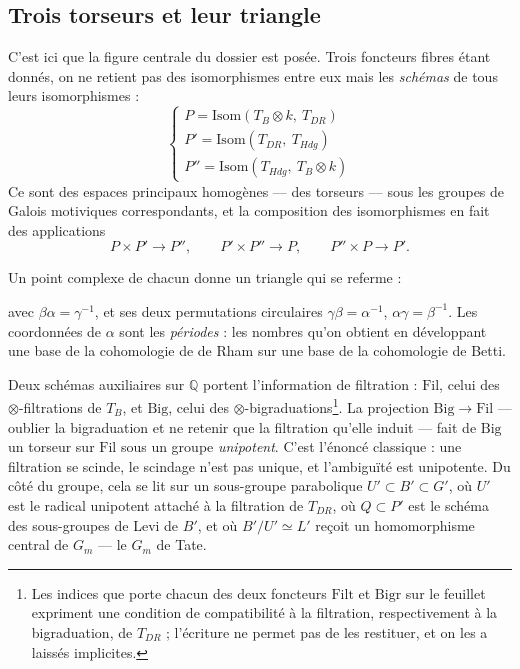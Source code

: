 \documentclass[11pt,a4paper]{article}
\begin{document}
\subsection*{Trois torseurs et leur triangle}

C'est ici que la figure centrale du dossier est posée. Trois foncteurs fibres
étant donnés, on ne retient pas des isomorphismes entre eux mais les
\emph{schémas} de tous leurs isomorphismes :
\[
  \begin{cases}
    P = \mathrm{Isom}(T_{B} \otimes k,\ T_{DR}) \\
    P' = \mathrm{Isom}(T_{DR},\ T_{Hdg}) \\
    P'' = \mathrm{Isom}(T_{Hdg},\ T_{B} \otimes k)
  \end{cases}
\]
Ce sont des espaces principaux homogènes — des torseurs — sous les groupes de
Galois motiviques correspondants, et la composition des isomorphismes en fait
des applications
\[
  P \times P' \to P'' , \qquad P' \times P'' \to P , \qquad P'' \times P \to P' .
\]

Un point complexe de chacun donne un triangle qui se referme :


avec $\beta\alpha = \gamma^{-1}$, et ses deux permutations circulaires
$\gamma\beta = \alpha^{-1}$, $\alpha\gamma = \beta^{-1}$. Les coordonnées de
$\alpha$ sont les \emph{périodes} : les nombres qu'on obtient en développant une
base de la cohomologie de de Rham sur une base de la cohomologie de Betti.

Deux schémas auxiliaires sur $\mathbb{Q}$ portent l'information de filtration :
$\mathrm{Fil}$, celui des $\otimes$-filtrations de $T_{B}$, et $\mathrm{Big}$,
celui des $\otimes$-bigraduations\footnote{Les indices que porte chacun des deux
foncteurs $\mathrm{Filt}$ et $\mathrm{Bigr}$ sur le feuillet expriment une
condition de compatibilité à la filtration, respectivement à la bigraduation, de
$T_{DR}$ ; l'écriture ne permet pas de les restituer, et on les a laissés
implicites.}. La projection
$\mathrm{Big} \to \mathrm{Fil}$ — oublier la bigraduation et ne retenir que la
filtration qu'elle induit — fait de $\mathrm{Big}$ un torseur sur
$\mathrm{Fil}$ sous un groupe \emph{unipotent}. C'est l'énoncé classique : une
filtration se scinde, le scindage n'est pas unique, et l'ambiguïté est
unipotente. Du côté du groupe, cela se lit sur un sous-groupe parabolique
$U' \subset B' \subset G'$, où $U'$ est le radical unipotent attaché à la
filtration de $T_{DR}$, où $Q \subset P'$ est le schéma des sous-groupes de
Levi de $B'$, et où $B'/U' \simeq L'$ reçoit un homomorphisme central de
$G_{m}$ — le $G_{m}$ de Tate.
\end{document}

